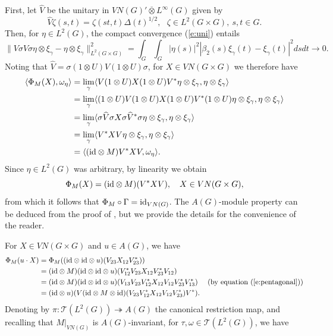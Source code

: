 \documentclass[preprint,12pt]{elsarticle}
\newcommand{\mc}[1]{\mathcal{#1}}
\newcommand{\la}{\langle}
\newcommand{\ra}{\rangle}
\newcommand{\LT}{L^2(G)}
\newcommand{\LI}{L^{\infty}(G)}
\newcommand{\TC}{\mc{T}(L^2(G))}
\newcommand{\Gam}{\Gamma}
\newcommand{\om}{\omega}
\newcommand{\ten}{\otimes}
\newcommand{\oten}{\overline{\otimes}}
\newcommand{\id}{\textnormal{id}}
\newcommand{\h}[1]{\widehat{#1}}
\providecommand{\norm}[1]{\lVert#1\rVert}
\begin{document}
\begin{pf}
First, let $\h{V}$ be the unitary in $VN(G)'\oten\LI$ given by
$$\h{V}\zeta(s,t)=\zeta(st,t)\Delta(t)^{1/2}, \ \ \ \zeta\in L^2(G\times G), \ s,t\in G.$$
Then, for $\eta\in\LT$, the compact convergence (\ref{e:uni}) entails
$$\norm{V\sigma \h{V}\sigma\eta\ten\xi_\gamma - \eta\ten\xi_\gamma}^2_{L^2(G\times G)}=\int_G\int_G |\eta(s)|^2|\beta_2(s)\xi_\gamma(t)-\xi_\gamma(t)|^2dsdt\rightarrow 0.$$
Noting that $\h{V}=\sigma(1\ten U)V(1\ten U)\sigma$, for $X\in VN(G\times G)$ we therefore have
\begin{align*}\la\Phi_M(X),\om_{\eta}\ra&=\lim_\gamma\la V(1\ten U)X(1\ten U)V^*\eta\ten\xi_\gamma,\eta\ten\xi_\gamma\ra\\
&=\lim_\gamma\la(1\ten U)V(1\ten U)X(1\ten U)V^*(1\ten U)\eta\ten\xi_\gamma,\eta\ten\xi_\gamma\ra\\
&=\lim_\gamma\la\sigma \h{V}\sigma X\sigma \h{V}^*\sigma\eta\ten\xi_\gamma,\eta\ten\xi_\gamma\ra\\
&=\lim_\gamma\la V^*XV\eta\ten\xi_\gamma,\eta\ten\xi_\gamma\ra\\
&=\la (\id\ten M)V^*XV,\om_\eta\ra.\end{align*}
Since $\eta\in\LT$ was arbitrary, by linearity we obtain
$$\Phi_M(X)=(\id\ten M)(V^*XV), \ \ \ X\in VN(G\times G),$$
from which it follows that $\Phi_M\circ\Gam=\id_{VN(G)}$. The $A(G)$-module property can be deduced from the proof of \cite[Theorem 5.5]{CN}, but we  provide the details for the convenience of the reader.

For $X\in VN(G\times G)$ and $u\in A(G)$, we have
\begin{align*}\Phi_M(u\cdot X)&=\Phi_M((\id\ten\id\ten u)(V_{23}X_{12}V_{23}^*))\\
&=(\id\ten M)(\id\ten\id\ten u)(V_{12}^*V_{23}X_{12}V_{23}^*V_{12})\\
                              &=(\id\ten M)(\id\ten\id\ten u)(V_{13}V_{23}V_{12}^*X_{12}V_{12}V_{23}^*V_{13}^*) \ \ \ \  \textnormal{(by equation (\ref{e:pentagonal}))}\\
                              &=(\id\ten u)(V(\id\ten M\ten\id)(V_{23}V_{12}^*X_{12}V_{12}V_{23}^*)V^*). \end{align*}
Denoting by $\pi:\TC\twoheadrightarrow  A(G)$ the canonical restriction map, and recalling that $M|_{VN(G)}$ is $A(G)$-invariant, for $\tau,\om\in\TC$, we have


\end{pf}
\end{document}
